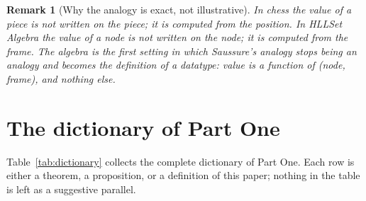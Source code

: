 \documentclass[11pt,a4paper]{article}
\newtheorem{remark}[principle]{Remark}
\theoremstyle{remark}
\begin{document}
\begin{remark}[Why the analogy is exact, not illustrative]
In chess the value of a piece is not written on the piece; it is computed from
the position. In HLLSet Algebra the value of a node is not written on the
node; it is computed from the frame. The algebra is the first setting in which
Saussure's analogy stops being an analogy and becomes the definition of a
datatype: value is a function of (node, frame), and nothing else.
\end{remark}

\section{The dictionary of Part One}
\label{sec:dictionary}

Table~\ref{tab:dictionary} collects the complete dictionary of Part One. Each
row is either a theorem, a proposition, or a definition of this paper; nothing
in the table is left as a suggestive parallel.
\end{document}
